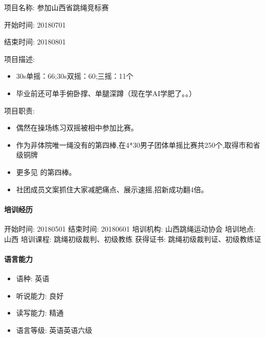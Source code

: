 \documentclass[letterpaper,11pt,english]{sphinxmanual}
\begin{document}
项目名称: 参加山西省跳绳竞标赛

开始时间: 2018\sphinxhyphen{}07\sphinxhyphen{}01

结束时间: 2018\sphinxhyphen{}08\sphinxhyphen{}01

项目描述:
\begin{itemize}
\item {} 
30s单摇：66;30s双摇：60;三摇：11个

\item {} 
毕业前还可单手俯卧撑、单腿深蹲（现在学AI学肥了。。）

\end{itemize}

项目职责:
\begin{itemize}
\item {} 
偶然在操场练习双摇被相中参加比赛。

\item {} 
作为非体院唯一绳没有的第四棒,在4*30男子团体单摇比赛共250个,取得市和省级铜牌

\item {} 
更多见 
的第四棒。

\item {} 
社团成员文案抓住大家减肥痛点、展示速摇,招新成功翻4倍。

\end{itemize}


\paragraph{培训经历}
\label{\detokenize{get_started:id5}}
开始时间: 2018\sphinxhyphen{}05\sphinxhyphen{}01 结束时间: 2018\sphinxhyphen{}06\sphinxhyphen{}01 培训机构: 山西跳绳运动协会
培训地点: 山西 培训课程: 跳绳初级裁判、初级教练 获得证书:
跳绳初级裁判证、初级教练证


\paragraph{语言能力}
\label{\detokenize{get_started:id6}}\begin{itemize}
\item {} 
语种: 英语

\item {} 
听说能力: 良好

\item {} 
读写能力: 精通

\item {} 
语言等级: 英语\sphinxhyphen{}英语六级

\end{itemize}
\end{document}

